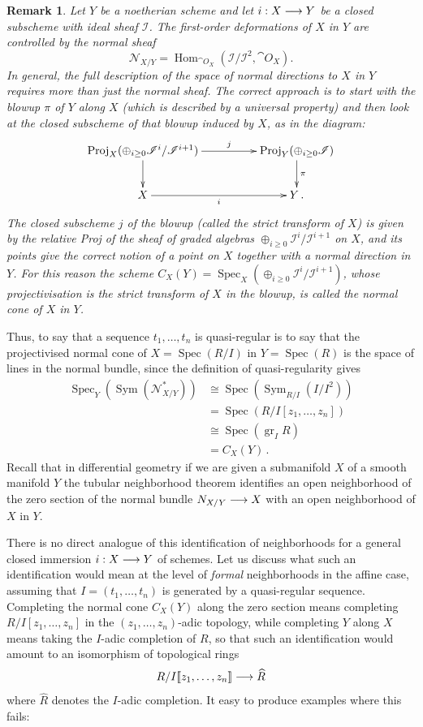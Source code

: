 \documentclass[english,letter paper,12pt,leqno]{article}
\theoremstyle{example}
\newtheorem{remark}[theorem]{Remark}
\numberwithin{equation}{section}
\def\Hom{\operatorname{Hom}}
\def\be{\begin{equation}}
\def\ee{\end{equation}}
\DeclareMathOperator{\Spec}{Spec}
\begin{document}
\begin{remark} Let $Y$ be a noetherian scheme and let $i: X \longrightarrow Y$ be a closed subscheme with ideal sheaf $\mathscr{I}$. The first-order deformations of $X$ in $Y$ are controlled \cite[Theorem VI-29]{eisenbudharris} by the normal sheaf
\[
\mathscr{N}_{X/Y} = \Hom_{\cat{O}_X}(\mathscr{I}/\mathscr{I}^2, \cat{O}_X).
\]
In general, the full description of the space of normal directions to $X$ in $Y$ requires more than just the normal sheaf. The correct approach is to start with the blowup $\pi$ of $Y$ along $X$ (which is described by a universal property) and then look at the closed subscheme of that blowup induced by $X$, as in the diagram:
\[
\xymatrix@C+2pc{
\operatorname{Proj}_X( \oplus_{i \ge 0} \mathscr{I}^i/\mathscr{I}^{i+1} ) \ar[r]^-j\ar[d] & \operatorname{Proj}_Y( \oplus_{i \ge 0} \mathscr{I} ) \ar[d]^-{\pi}\\
X \ar[r]_-{i} & Y\,.
}
\]
The closed subscheme $j$ of the blowup (called the strict transform of $X$) is given by the relative Proj of the sheaf of graded algebras $\oplus_{i \ge 0} \mathscr{I}^i/\mathscr{I}^{i+1}$ on $X$, and its points give the correct notion of a point on $X$ together with a normal direction in $Y$. For this reason the scheme $C_X(Y) = \Spec_X( \oplus_{i \ge 0} \mathscr{I}^i / \mathscr{I}^{i+1} )$, whose projectivisation is the strict transform of $X$ in the blowup, is called the \emph{normal cone} of $X$ in $Y$.
\end{remark}

Thus, to say that a sequence $t_1,\ldots,t_n$ is quasi-regular is to say that the projectivised normal cone of $X = \Spec(R/I)$ in $Y = \Spec(R)$ is the space of lines in the normal bundle, since the definition of quasi-regularity gives 
\begin{align*}
\Spec_{Y}( \operatorname{Sym}( \mathscr{N}^*_{X/Y} ) ) &\cong \Spec( \operatorname{Sym}_{R/I}( I/I^2 ) )\\
&= \Spec( R/I[z_1,\ldots,z_n] )\\
&\cong \Spec( \operatorname{gr}_ I R)\\
&= C_X(Y)\,.
\end{align*}
Recall that in differential geometry if we are given a submanifold $X$ of a smooth manifold $Y$ the tubular neighborhood theorem \cite[\S 4.5]{hirsch} identifies an open neighborhood of the zero section of the normal bundle $N_{X/Y} \longrightarrow X$ with an open neighborhood of $X$ in $Y$. 

There is no direct analogue of this identification of neighborhoods for a general closed immersion $i: X \longrightarrow Y$ of schemes. Let us discuss what such an identification would mean at the level of \emph{formal} neighborhoods in the affine case, assuming that $I = (t_1,\ldots,t_n)$ is generated by a quasi-regular sequence. Completing the normal cone $C_X(Y)$ along the zero section means completing $R/I[z_1,\ldots,z_n]$ in the $(z_1,\ldots,z_n)$-adic topology, while completing $Y$ along $X$ means taking the $I$-adic completion of $R$, so that such an identification would amount to an isomorphism of topological rings
\be\label{eq:formaltubular}
R/I\llbracket z_1,\ldots,z_n \rrbracket \lto \widehat{R}
\ee
where $\widehat{R}$ denotes the $I$-adic completion. It easy to produce examples where this fails:
\end{document}
